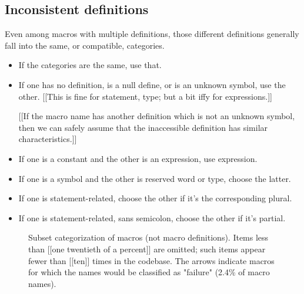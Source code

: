 \documentclass[10pt]{article}
\begin{document}
\subsection{Inconsistent definitions}
\label{sec:inconsistent}

Even among macros with multiple definitions, those different definitions
generally fall into the same, or compatible, categories.

\begin{itemize}
\item If the categories are the same, use that.

\item If one has no definition, is a null define, or is an unknown symbol, use
  the other.  [[This is fine for statement, type; but a bit iffy for
  expressions.]]

  [[If the macro name has another definition
  which is not an unknown symbol, then we can safely assume that the
  inaccessible definition has similar characteristics.]]

\item If one is a constant and the other is an expression, use expression.

\item If one is a symbol and the other is reserved word or type, choose the latter.

\item If one is statement-related, choose the other if it's the corresponding plural.
\item If one is statement-related, sans semicolon, choose the other if it's partial.
\end{itemize}

\begin{figure}
  {\small\centerline{}}
  \caption{Subset categorization of macros (not macro definitions).   Items
    less than [[one twentieth of a percent]] are omitted; such items appear
    fewer than [[ten]] times in the codebase.
    The arrows indicate macros for which the names would be classified
    as "failure" (2.4\% of macro names).}
  \label{fig:subset-categories}
\end{figure}
\end{document}
